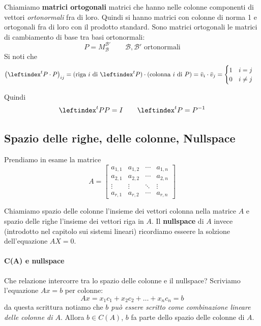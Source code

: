 \documentclass[x11names]{article}
\begin{document}
\noindent
Chiamiamo \textbf{matrici ortogonali} matrici che hanno nelle colonne componenti di vettori \textit{ortonormali} fra di loro. Quindi si hanno matrici con colonne di norma 1 e ortogonali fra di loro con il prodotto standard. Sono matrici ortogonali le matrici di cambiamento di base tra basi ortonormali:
\[
P = M^{\mathcal{B}'}_{\mathcal{B}} \qquad \mathcal{B},\mathcal{B}' \text{ ortonormali}
\]
Si noti che 
\[
\left(\leftindex^{t}{P}\cdot P\right)_{ij} = (\text{riga } i \text{ di } \leftindex^{t}{P}) \cdot (\text{colonna } i \text{ di } P) = \bar{v}_{i} \cdot \bar{v}_{j} = \begin{cases}
	1 \quad i = j\\
	0 \quad i \neq j
\end{cases}
\] 

Quindi
\[
\leftindex^{t}{P}P = I \qquad \leftindex^{t}{P} = P^{-1}
\]

\subsection{Spazio delle righe, delle colonne, Nullspace}
Prendiamo in esame la matrice
\[
A=
\begin{bmatrix}a_{1,1}&a_{1,2}&\cdots &a_{1,n}\\a_{2,1}&a_{2,2}&\cdots &a_{2,n}\\ \vdots &\vdots &\ddots &\vdots \\a_{r,1}&a_{r,2}&\cdots &a_{r,n}\end{bmatrix}
\] 

Chiamiamo spazio delle colonne l'insieme dei vettori colonna nella matrice $A$ e spazio delle righe l'insieme dei vettori riga in  $A$. Il \textbf{nullspace} di $A$ invece (introdotto nel capitolo sui sistemi lineari) ricordiamo esseere la solzione dell'equazione  $AX = 0$.

\paragraph{C(A) e nullspace}

Che relazione intercorre tra lo spazio delle colonne e il nullspace?
Scriviamo l'equazione $Ax = b$ per colonne:
\[
	Ax = x_1c_1 + x_2c_{2} + \dots + x_{n}c_{n} = b
\] 
da questa scrittura notiamo che \textit{$b$ può essere scritto come combinazione lineare delle colonne di $A$}. Allora $b \in C\left(A\right)$, $b$ fa parte dello spazio delle colonne di $A$. 
\end{document}
